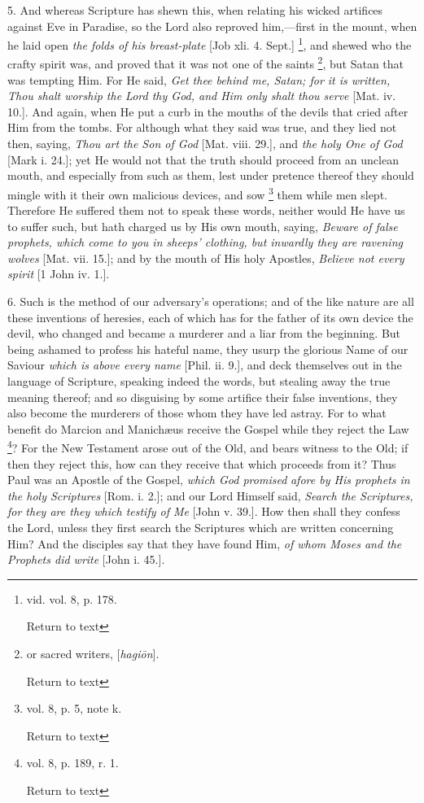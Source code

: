 5. And whereas Scripture has shewn this, when
relating his wicked artifices against Eve in Paradise, so the Lord
also reproved him,—first in the mount, when he laid open \emph{the
folds of his breast-plate} [Job xli. 4. Sept.] \footnote{vid. vol. 8, p. 178.

Return to text}, and shewed who the crafty spirit was, and proved that it was
not one of the saints \footnote{or sacred writers, [\emph{hagi\={o}n}].

Return to text},
but Satan that was tempting Him. For He said, \emph{Get thee behind me,
Satan; for it is written, Thou shalt worship the Lord thy God, and Him
only shalt thou serve} [Mat. iv. 10.]. And again, when He put a
curb in the mouths of the devils that cried after Him from the tombs.
For although what they said was true, and they lied not then, saying, \emph{Thou
art the Son of God} [Mat. viii. 29.], and \emph{the holy One of God}
[Mark i. 24.]; yet He would not that the truth should proceed from an
unclean mouth, and especially from such as them, lest under pretence
thereof they should mingle with it their own malicious devices, and
sow \footnote{vol. 8, p. 5, note k.

Return to text} them while men
slept. Therefore He suffered them not to speak these words, neither
would He have us to suffer such, but hath charged us by His own mouth,
saying, \emph{Beware of false prophets, which come to you in sheeps'
clothing, but inwardly they are ravening wolves} [Mat. vii. 15.];
and by the mouth of His holy Apostles, \emph{Believe not every spirit}
[1 John iv. 1.].

6. Such is the method of our adversary's
operations; and of the like nature are all these inventions of
heresies, each of which has for the father of its own device the
devil, who changed and became a murderer and a liar from the
beginning. But being ashamed to profess his hateful name, they usurp
the glorious Name of our Saviour \emph{which is above every name}
[Phil. ii. 9.], and deck themselves out in the language of Scripture,
speaking indeed the words, but stealing away the true meaning thereof;
and so disguising by some artifice their false inventions, they also
become the murderers of those whom they have led astray. For to what
benefit do Marcion and Manichæus receive the Gospel while they reject
the Law \footnote{vol. 8, p. 189, r. 1.

Return to text}? For the New
Testament arose out of the Old, and bears witness to the Old; if then
they reject this, how can they receive that which proceeds from it?
Thus Paul was an Apostle of the Gospel, \emph{which God promised}
\emph{afore by His prophets in the holy Scriptures} [Rom. i.
2.]; and our Lord Himself said, \emph{Search the Scriptures, for they are
they which testify of Me} [John v. 39.]. How then shall they
confess the Lord, unless they first search the Scriptures which are
written concerning Him? And the disciples say that they have found
Him, \emph{of whom Moses and the Prophets did write} [John i. 45.].

